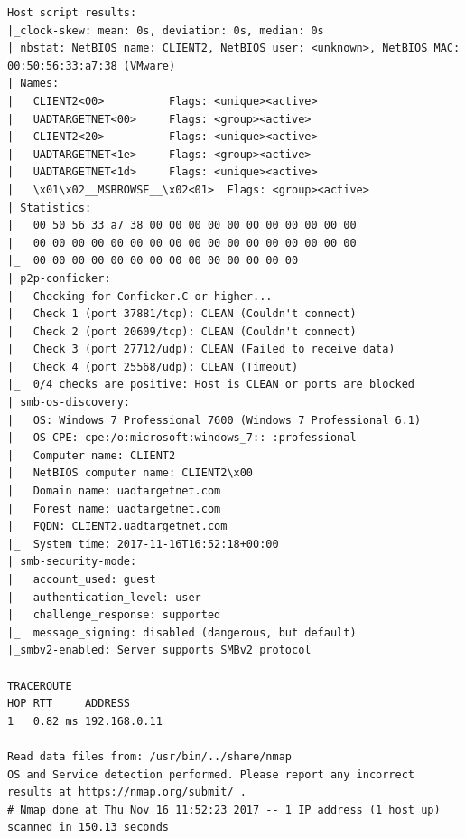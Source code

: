 \documentclass[12pt,a4paper]{article}
\begin{document}
\begin{appendices}
\begin{lstlisting}
Host script results:
|_clock-skew: mean: 0s, deviation: 0s, median: 0s
| nbstat: NetBIOS name: CLIENT2, NetBIOS user: <unknown>, NetBIOS MAC: 00:50:56:33:a7:38 (VMware)
| Names:
|   CLIENT2<00>          Flags: <unique><active>
|   UADTARGETNET<00>     Flags: <group><active>
|   CLIENT2<20>          Flags: <unique><active>
|   UADTARGETNET<1e>     Flags: <group><active>
|   UADTARGETNET<1d>     Flags: <unique><active>
|   \x01\x02__MSBROWSE__\x02<01>  Flags: <group><active>
| Statistics:
|   00 50 56 33 a7 38 00 00 00 00 00 00 00 00 00 00 00
|   00 00 00 00 00 00 00 00 00 00 00 00 00 00 00 00 00
|_  00 00 00 00 00 00 00 00 00 00 00 00 00 00
| p2p-conficker:
|   Checking for Conficker.C or higher...
|   Check 1 (port 37881/tcp): CLEAN (Couldn't connect)
|   Check 2 (port 20609/tcp): CLEAN (Couldn't connect)
|   Check 3 (port 27712/udp): CLEAN (Failed to receive data)
|   Check 4 (port 25568/udp): CLEAN (Timeout)
|_  0/4 checks are positive: Host is CLEAN or ports are blocked
| smb-os-discovery:
|   OS: Windows 7 Professional 7600 (Windows 7 Professional 6.1)
|   OS CPE: cpe:/o:microsoft:windows_7::-:professional
|   Computer name: CLIENT2
|   NetBIOS computer name: CLIENT2\x00
|   Domain name: uadtargetnet.com
|   Forest name: uadtargetnet.com
|   FQDN: CLIENT2.uadtargetnet.com
|_  System time: 2017-11-16T16:52:18+00:00
| smb-security-mode:
|   account_used: guest
|   authentication_level: user
|   challenge_response: supported
|_  message_signing: disabled (dangerous, but default)
|_smbv2-enabled: Server supports SMBv2 protocol

TRACEROUTE
HOP RTT     ADDRESS
1   0.82 ms 192.168.0.11

Read data files from: /usr/bin/../share/nmap
OS and Service detection performed. Please report any incorrect results at https://nmap.org/submit/ .
# Nmap done at Thu Nov 16 11:52:23 2017 -- 1 IP address (1 host up) scanned in 150.13 seconds
		\end{lstlisting}

\end{appendices}
\end{document}
